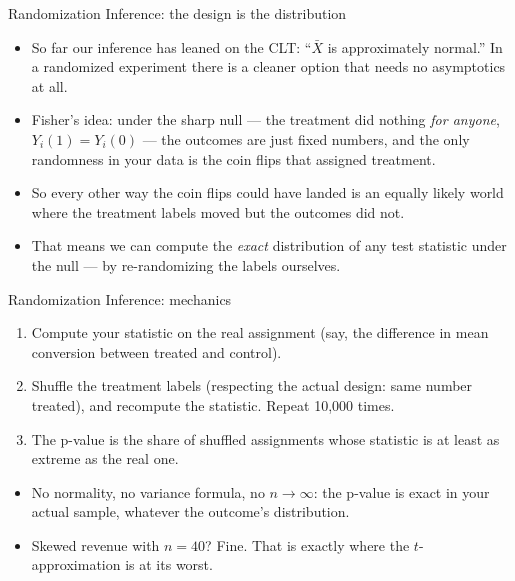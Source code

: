 \documentclass[aspectratio=169,11pt]{beamer}
\begin{document}
\begin{frame}{Randomization Inference: the design is the distribution}
\begin{itemize}
	\item So far our inference has leaned on the CLT: ``$\bar{X}$ is approximately
	normal.'' In a randomized experiment there is a cleaner option that needs
	\alert{no asymptotics at all}.

	\medskip
	\item Fisher's idea: under the \alert{sharp null} --- the treatment did nothing
	\emph{for anyone}, $Y_i(1) = Y_i(0)$ --- the outcomes are just fixed numbers, and
	the \alert{only} randomness in your data is the coin flips that assigned treatment.

	\medskip
	\item So every other way the coin flips could have landed is an equally likely
	world where the treatment labels moved but the outcomes did not.

	\medskip
	\item That means we can compute the \emph{exact} distribution of any test
	statistic under the null --- by re-randomizing the labels ourselves.
\end{itemize}
\end{frame}


\begin{frame}{Randomization Inference: mechanics}
\begin{enumerate}
	\item Compute your statistic on the real assignment (say, the difference in mean
	conversion between treated and control).

	\medskip
	\item \alert{Shuffle the treatment labels} (respecting the actual design: same
	number treated), and recompute the statistic. Repeat 10{,}000 times.

	\medskip
	\item The p-value is the share of shuffled assignments whose statistic is at
	least as extreme as the real one.
\end{enumerate}
\bigskip
\begin{itemize}
	\item No normality, no variance formula, no $n \rightarrow \infty$: the p-value
	is exact in your actual sample, whatever the outcome's distribution.
	\item Skewed revenue with $n = 40$? Fine. That is exactly where the
	$t$-approximation is at its worst.
\end{itemize}
\end{frame}
\end{document}
